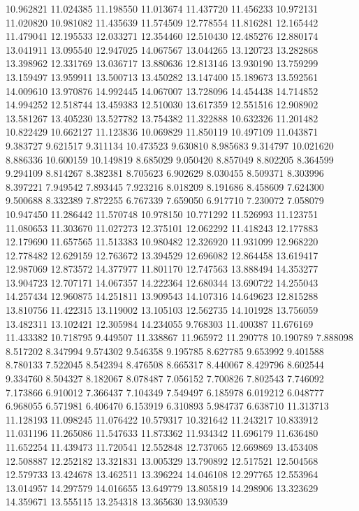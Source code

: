 10.962821
11.024385
11.198550
11.013674
11.437720
11.456233
10.972131
11.020820
10.981082
11.435639
11.574509
12.778554
11.816281
12.165442
11.479041
12.195533
12.033271
12.354460
12.510430
12.485276
12.880174
13.041911
13.095540
12.947025
14.067567
13.044265
13.120723
13.282868
13.398962
12.331769
13.036717
13.880636
12.813146
13.930190
13.759299
13.159497
13.959911
13.500713
13.450282
13.147400
15.189673
13.592561
14.009610
13.970876
14.992445
14.067007
13.728096
14.454438
14.714852
14.994252
12.518744
13.459383
12.510030
13.617359
12.551516
12.908902
13.581267
13.405230
13.527782
13.754382
11.322888
10.632326
11.201482
10.822429
10.662127
11.123836
10.069829
11.850119
10.497109
11.043871
9.383727
9.621517
9.311134
10.473523
9.630810
8.985683
9.314797
10.021620
8.886336
10.600159
10.149819
8.685029
9.050420
8.857049
8.802205
8.364599
9.294109
8.814267
8.382381
8.705623
6.902629
8.030455
8.509371
8.303996
8.397221
7.949542
7.893445
7.923216
8.018209
8.191686
8.458609
7.624300
9.500688
8.332389
7.872255
6.767339
7.659050
6.917710
7.230072
7.058079
10.947450
11.286442
11.570748
10.978150
10.771292
11.526993
11.123751
11.080653
11.303670
11.027273
12.375101
12.062292
11.418243
12.177883
12.179690
11.657565
11.513383
10.980482
12.326920
11.931099
12.968220
12.778482
12.629159
12.763672
13.394529
12.696082
12.864458
13.619417
12.987069
12.873572
14.377977
11.801170
12.747563
13.888494
14.353277
13.904723
12.707171
14.067357
14.222364
12.680344
13.690722
14.255043
14.257434
12.960875
14.251811
13.909543
14.107316
14.649623
12.815288
13.810756
11.422315
13.119002
13.105103
12.562735
14.101928
13.756059
13.482311
13.102421
12.305984
14.234055
9.768303
11.400387
11.676169
11.433382
10.718795
9.449507
11.338867
11.965972
11.290778
10.190789
7.888098
8.517202
8.347994
9.574302
9.546358
9.195785
8.627785
9.653992
9.401588
8.780133
7.522045
8.542394
8.476508
8.665317
8.440067
8.429796
8.602544
9.334760
8.504327
8.182067
8.078487
7.056152
7.700826
7.802543
7.746092
7.173866
6.910012
7.366437
7.104349
7.549497
6.185978
6.019212
6.048777
6.968055
6.571981
6.406470
6.153919
6.310893
5.984737
6.638710
11.313713
11.128193
11.098245
11.076422
10.579317
10.321642
11.243217
10.833912
11.031196
11.265086
11.547633
11.873362
11.934342
11.696179
11.636480
11.652254
11.439473
11.720541
12.552848
12.737065
12.669869
13.453408
12.508887
12.252182
13.321831
13.005329
13.790892
12.517521
12.504568
12.579733
13.424678
13.462511
13.396224
14.046108
12.297765
12.553964
13.014957
14.297579
14.016655
13.649779
13.805819
14.298906
13.323629
14.359671
13.555115
13.254318
13.365630
13.930539
